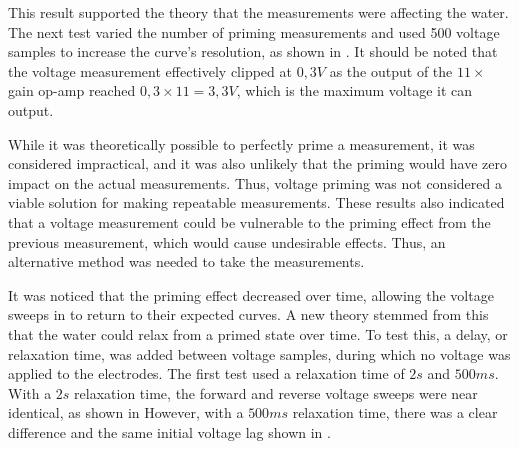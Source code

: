 This result supported the theory that the measurements were affecting the water.
The next test varied the number of priming measurements and used 500 voltage samples to increase the curve's resolution, as shown in .
It should be noted that the voltage measurement effectively clipped at $0,3V$ as the output of the $11\times$ gain op-amp reached $0,3\times 11 = 3,3V$, which is the maximum voltage it can output.

While it was theoretically possible to perfectly prime a measurement, it was considered impractical, and it was also unlikely that the priming would have zero impact on the actual measurements.
Thus, voltage priming was not considered a viable solution for making repeatable measurements.
These results also indicated that a voltage measurement could be vulnerable to the priming effect from the previous measurement, which would cause undesirable effects.
Thus, an alternative method was needed to take the measurements.

It was noticed that the priming effect decreased over time, allowing the voltage sweeps in  to return to their expected curves.
A new theory stemmed from this that the water could relax from a primed state over time.
To test this, a delay, or relaxation time, was added between voltage samples, during which no voltage was applied to the electrodes.
The first test used a relaxation time of $2s$ and $500ms$.
With a $2s$ relaxation time, the forward and reverse voltage sweeps were near identical, as shown in 
However, with a $500ms$ relaxation time, there was a clear difference and the same initial voltage lag shown in .

